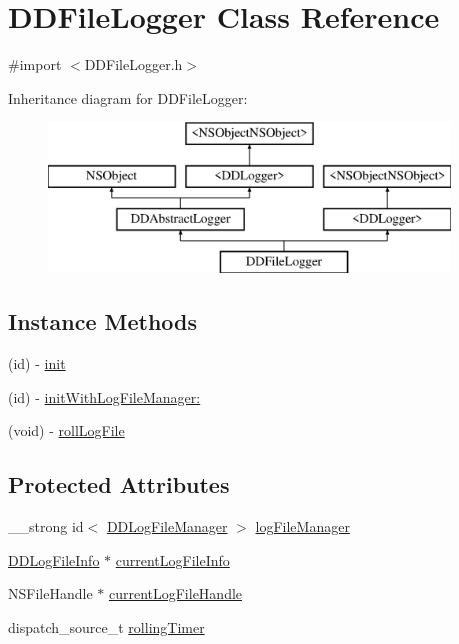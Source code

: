 \hypertarget{interface_d_d_file_logger}{\section{D\-D\-File\-Logger Class Reference}
\label{interface_d_d_file_logger}
}


{\ttfamily \#import $<$D\-D\-File\-Logger.\-h$>$}

Inheritance diagram for D\-D\-File\-Logger\-:\begin{figure}[H]
\begin{center}
\leavevmode
\includegraphics[height=4.000000cm]{interface_d_d_file_logger}
\end{center}
\end{figure}
\subsection*{Instance Methods}
\begin{DoxyCompactItemize}
\item 
(id) -\/ \hyperlink{interface_d_d_file_logger_a50f0c519d884f3c22369e05899db3aa1}{init}
\item 
(id) -\/ \hyperlink{interface_d_d_file_logger_a465de50ce0a9cf84d19e319501746aaa}{init\-With\-Log\-File\-Manager\-:}
\item 
(void) -\/ \hyperlink{interface_d_d_file_logger_ab0bb4fbddf347c6e5ce250957e68378e}{roll\-Log\-File}
\end{DoxyCompactItemize}
\subsection*{Protected Attributes}
\begin{DoxyCompactItemize}
\item 
\-\_\-\-\_\-strong id$<$ \hyperlink{protocol_d_d_log_file_manager-p}{D\-D\-Log\-File\-Manager} $>$ \hyperlink{interface_d_d_file_logger_ae69b973e11c50a89793cab1c0dcca5fd}{log\-File\-Manager}
\item 
\hyperlink{interface_d_d_log_file_info}{D\-D\-Log\-File\-Info} $\ast$ \hyperlink{interface_d_d_file_logger_a042114b326036e139f1f6ef500683696}{current\-Log\-File\-Info}
\item 
N\-S\-File\-Handle $\ast$ \hyperlink{interface_d_d_file_logger_a984d7760af0949c892412e1a0693e4d0}{current\-Log\-File\-Handle}
\item 
dispatch\-\_\-source\-\_\-t \hyperlink{interface_d_d_file_logger_ae42a4b7eddcb79f6ae5af833a0e2b55f}{rolling\-Timer}
\end{DoxyCompactItemize}
